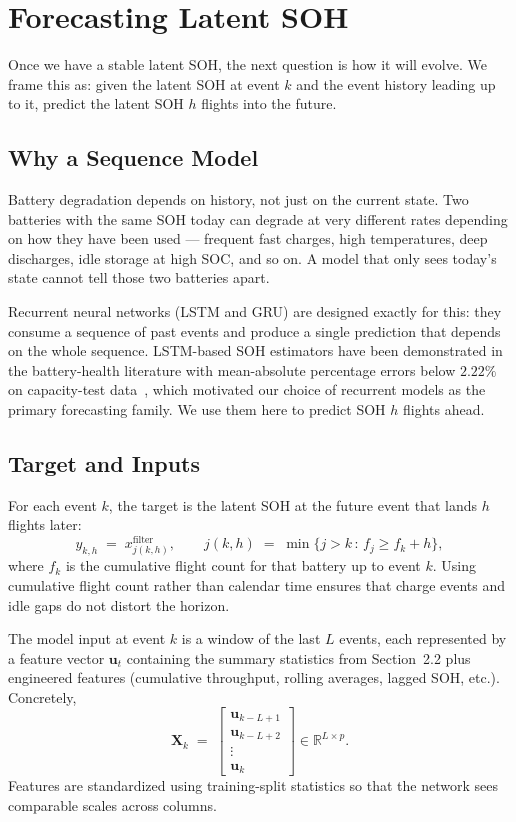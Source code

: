 \documentclass[11pt]{article}
\begin{document}
\section{Forecasting Latent SOH}

Once we have a stable latent SOH, the next question is how it will
evolve. We frame this as: given the latent SOH at event \(k\) and the
event history leading up to it, predict the latent SOH \(h\) flights
into the future.

\subsection{Why a Sequence Model}

Battery degradation depends on history, not just on the current state.
Two batteries with the same SOH today can degrade at very different
rates depending on how they have been used --- frequent fast charges,
high temperatures, deep discharges, idle storage at high SOC, and so on.
A model that only sees today's state cannot tell those two batteries
apart.

Recurrent neural networks (LSTM and GRU) are designed exactly for this:
they consume a sequence of past events and produce a single prediction
that depends on the whole sequence. LSTM-based SOH estimators have been
demonstrated in the battery-health literature with mean-absolute
percentage errors below \(2.22\%\) on capacity-test
data~\cite{yu2022soh}, which motivated our choice of recurrent models
as the primary forecasting family. We use them here to predict SOH
\(h\) flights ahead.

\subsection{Target and Inputs}

For each event \(k\), the target is the latent SOH at the future event
that lands \(h\) flights later:
\begin{equation}
y_{k,h} \;=\; x^{\mathrm{filter}}_{j(k,h)},
\qquad
j(k,h) \;=\; \min\{ j > k \,:\, f_j \ge f_k + h\},
\end{equation}
where \(f_k\) is the cumulative flight count for that battery up to
event \(k\). Using cumulative flight count rather than calendar time
ensures that charge events and idle gaps do not distort the horizon.

The model input at event \(k\) is a window of the last \(L\) events,
each represented by a feature vector \(\mathbf{u}_t\) containing the
summary statistics from Section~2.2 plus engineered features
(cumulative throughput, rolling averages, lagged SOH, etc.). Concretely,
\begin{equation}
\mathbf{X}_k \;=\;
\begin{bmatrix}
\mathbf{u}_{k-L+1} \\
\mathbf{u}_{k-L+2} \\
\vdots \\
\mathbf{u}_k
\end{bmatrix} \in \mathbb{R}^{L\times p}.
\end{equation}
Features are standardized using training-split statistics so that the
network sees comparable scales across columns.
\end{document}
